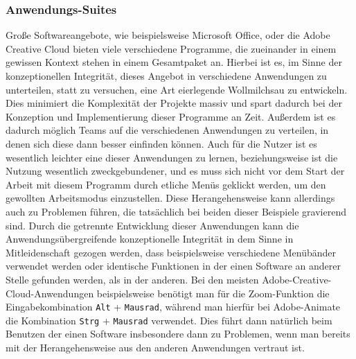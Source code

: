 \documentclass[a4paper, ngerman, 12pt, usenames, dvipsnames]{article}
\begin{document}
\subsubsection{Anwendungs-Suites}
Große Softwareangebote, wie beispielsweise Microsoft Office, oder die Adobe Creative Cloud bieten viele verschiedene Programme, die zueinander in einem gewissen Kontext stehen in einem Gesamtpaket an. Hierbei ist es, im Sinne der konzeptionellen Integrität, dieses Angebot in verschiedene Anwendungen zu unterteilen, statt zu versuchen, eine Art eierlegende Wollmilchsau zu entwickeln. Dies minimiert die Komplexität der Projekte massiv und spart dadurch bei der Konzeption und Implementierung dieser Programme an Zeit. Außerdem ist es dadurch möglich Teams auf die verschiedenen Anwendungen zu verteilen, in denen sich diese dann besser einfinden können. Auch für die Nutzer ist es wesentlich leichter eine dieser Anwendungen zu lernen, beziehungsweise ist die Nutzung wesentlich zweckgebundener, und es muss sich nicht vor dem Start der Arbeit mit diesem Programm durch etliche Menüs geklickt werden, um den gewollten Arbeitsmodus einzustellen. Diese Herangehensweise kann allerdings auch zu Problemen führen, die tatsächlich bei beiden dieser Beispiele gravierend sind. Durch die getrennte Entwicklung dieser Anwendungen kann die Anwendungsübergreifende konzeptionelle Integrität in dem Sinne in Mitleidenschaft gezogen werden, dass beispielsweise verschiedene Menübänder verwendet werden oder identische Funktionen in der einen Software an anderer Stelle gefunden werden, als in der anderen. Bei den meisten Adobe-Creative-Cloud-Anwendungen beispielsweise benötigt man für die Zoom-Funktion die Eingabekombination \texttt{Alt} + \texttt{Mausrad}, während man hierfür bei Adobe-Animate die Kombination \texttt{Strg} + \texttt{Mausrad} verwendet. Dies führt dann natürlich beim Benutzen der einen Software insbesondere dann zu Problemen, wenn man bereits mit der Herangehensweise aus den anderen Anwendungen vertraut ist.
\end{document}
